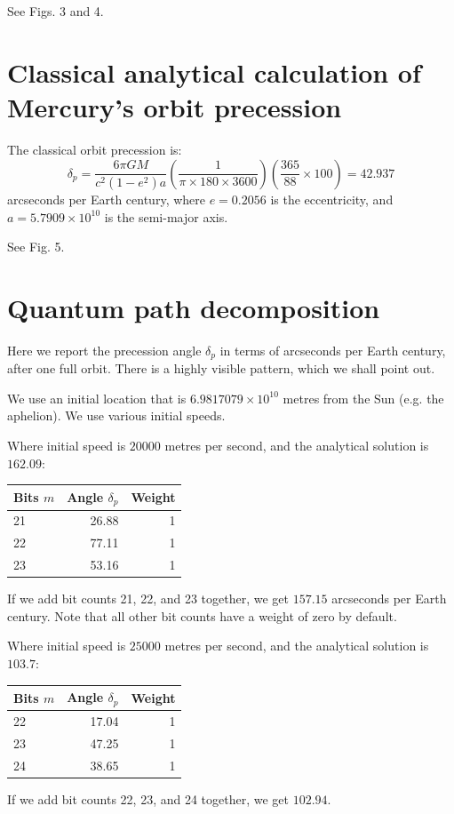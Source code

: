 \documentclass[12pt]{article}
\begin{document}
See Figs. 3 and 4.





\section{Classical analytical calculation of Mercury's orbit precession}

The classical orbit precession is:
\begin{equation}
\label{delta_p}
\delta_{p} = \frac{6 \pi G M}{c^2 (1 - e^2) a} \left( \frac{1}{ \pi \times 180 \times 3600} \right) \left( \frac{365}{88} \times 100 \right) = 42.937
\end{equation}
arcseconds per Earth century, where $e = 0.2056$ is the eccentricity, and $a = 5.7909 \times 10^{10}$ is the semi-major axis.

See Fig. 5.


\section{Quantum path decomposition}

Here we report the precession angle $\delta_{p}$ in terms of arcseconds per Earth century, after one full orbit.
There is a highly visible pattern, which we shall point out.

We use an initial location that is $6.9817079 \times 10^{10}$ metres from the Sun (e.g. the aphelion).
We use various initial speeds.

Where initial speed is $20000$ metres per second, and the analytical solution is $162.09$:
\begin{center}
\begin{tabular}{| l | r | r |}
  \hline
Bits $m$ & Angle $\delta_{p}$ & Weight\\
\hline
\hline
21 & 26.88 & 1 \\
22 & 77.11 & 1\\
23 & 53.16 & 1 \\
  \hline  
\end{tabular}
\end{center}
If we add bit counts 21, 22, and 23 together, we get $157.15$ arcseconds per Earth century.
Note that all other bit counts have a weight of zero by default.

Where initial speed is $25000$ metres per second, and the analytical solution is $103.7$:
\begin{center}
\begin{tabular}{| l | r | r |}
  \hline
Bits $m$ & Angle $\delta_{p}$ & Weight\\
\hline
\hline
22 & 17.04 & 1\\
23 & 47.25 & 1\\
24 & 38.65 & 1\\
  \hline  
\end{tabular}
\end{center}
If we add bit counts 22, 23, and 24 together, we get $102.94$.
\end{document}
